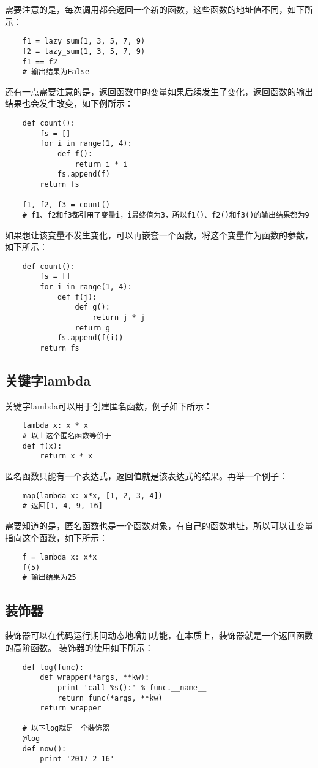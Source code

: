 \documentclass[a4paper,left=2.5cm,right=2.5cm,11pt]{article}
\begin{document}
	需要注意的是，每次调用都会返回一个新的函数，这些函数的地址值不同，如下所示：
	\begin{lstlisting}
	f1 = lazy_sum(1, 3, 5, 7, 9)
	f2 = lazy_sum(1, 3, 5, 7, 9)
	f1 == f2
	# 输出结果为False
	\end{lstlisting}

	还有一点需要注意的是，返回函数中的变量如果后续发生了变化，返回函数的输出结果也会发生改变，如下例所示：
	\begin{lstlisting}
	def count():
		fs = []
		for i in range(1, 4):
			def f():
				return i * i
			fs.append(f)
		return fs

	f1, f2, f3 = count()
	# f1、f2和f3都引用了变量i，i最终值为3，所以f1()、f2()和f3()的输出结果都为9
	\end{lstlisting}

	如果想让该变量不发生变化，可以再嵌套一个函数，将这个变量作为函数的参数，如下所示：
	\begin{lstlisting}
	def count():
		fs = []
		for i in range(1, 4):
			def f(j):
				def g():
					return j * j
				return g
			fs.append(f(i))
		return fs
	\end{lstlisting}

\subsection{关键字lambda}
	关键字lambda可以用于创建匿名函数，例子如下所示：
	\begin{lstlisting}
	lambda x: x * x
	# 以上这个匿名函数等价于
	def f(x):
		return x * x
	\end{lstlisting}

	匿名函数只能有一个表达式，返回值就是该表达式的结果。再举一个例子：
	\begin{lstlisting}
	map(lambda x: x*x, [1, 2, 3, 4])
	# 返回[1, 4, 9, 16]
	\end{lstlisting}

	需要知道的是，匿名函数也是一个函数对象，有自己的函数地址，所以可以让变量指向这个函数，如下所示：
	\begin{lstlisting}
	f = lambda x: x*x
	f(5)
	# 输出结果为25
	\end{lstlisting}

\subsection{装饰器}
	装饰器可以在代码运行期间动态地增加功能，在本质上，装饰器就是一个返回函数的高阶函数。
	装饰器的使用如下所示：
	\begin{lstlisting}
	def log(func):
		def wrapper(*args, **kw):
			print 'call %s():' % func.__name__
			return func(*args, **kw)
		return wrapper

	# 以下log就是一个装饰器
	@log
	def now():
		print '2017-2-16'
	\end{lstlisting}
\end{document}
